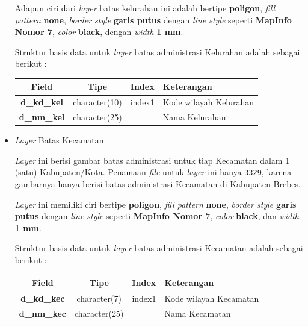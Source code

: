 \begin{itemize}
  Adapun ciri dari \textit{layer} batas kelurahan ini adalah bertipe \textbf{poligon}, \textit{fill pattern} \textbf{none}, \textit{border style} \textbf{garis putus} dengan \textit{line style} seperti \textbf{MapInfo Nomor 7}, \textit{color} \textbf{black}, dengan \textit{width} \textbf{1 mm}.
  
  Struktur basis data untuk \textit{layer} batas administrasi Kelurahan adalah sebagai berikut :
  
  \begin{table}[H]
    \centering
    \begin{tabular}{| c | c | c | p{7cm} |}
      \hline
      Field & Tipe & Index & Keterangan \\
      \hline\hline
      \textbf{d\_kd\_kel} & character(10) & index1 & Kode wilayah Kelurahan \\
      \hline
      \textbf{d\_nm\_kel} & character(25) & & Nama Kelurahan \\
      \hline
    \end{tabular}
  \end{table}
  
  \item \textit{Layer} Batas Kecamatan
  
  \textit{Layer} ini berisi gambar batas administrasi untuk tiap Kecamatan dalam 1 (satu) Kabupaten/Kota. Penamaan \textit{file} untuk \textit{layer} ini hanya \texttt{3329}, karena gambarnya hanya berisi batas administrasi Kecamatan di Kabupaten Brebes.
  
  \textit{Layer} ini memiliki ciri bertipe \textbf{poligon}, \textit{fill pattern} \textbf{none}, \textit{border style} \textbf{garis putus} dengan \textit{line style} seperti \textbf{MapInfo Nomor 7}, \textit{color} \textbf{black}, dan \textit{width} \textbf{1 mm}.
  
  Struktur basis data untuk \textit{layer} batas administrasi Kecamatan adalah sebagai berikut :
  
  \begin{table}[H]
    \centering
    \begin{tabular}{| c | c | c | p{7cm} |}
      \hline
      Field & Tipe & Index & Keterangan \\
      \hline\hline
      \textbf{d\_kd\_kec} & character(7) & index1 & Kode wilayah Kecamatan \\
      \hline
      \textbf{d\_nm\_kec} & character(25) & & Nama Kecamatan \\
      \hline
    \end{tabular}
  \end{table}
  

\end{itemize}
